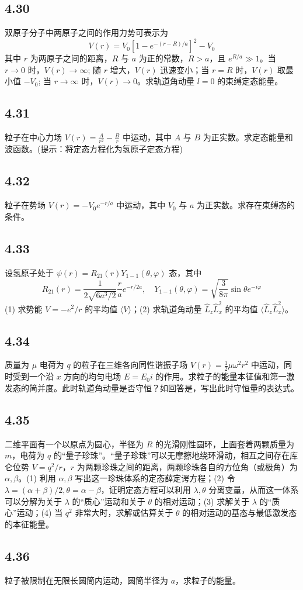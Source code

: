 \subsection{4.30}
双原子分子中两原子之间的作用力势可表示为
$$ V(r) = V_0 \left[ 1 - e^{-(r-R)/a} \right]^2 - V_0 $$
其中 $ r $ 为两原子之间的距离，$ R $ 与 $ a $ 为正的常数，$ R > a $，且 $ e^{R/a} \gg 1 $。当 $ r \to 0 $ 时，$ V(r) \to \infty $; 随 $ r $ 增大，$ V(r) $ 迅速变小；当 $ r = R $ 时，$ V(r) $ 取最小值 $-V_0$; 当 $ r \to \infty $ 时，$ V(r) \to 0 $。求轨道角动量 $ l = 0 $ 的束缚定态能量。

\subsection{4.31}
粒子在中心力场 $V(r) = \frac{A}{r^2} - \frac{B}{r}$ 中运动，其中 $A$ 与 $B$ 为正实数。求定态能量和波函数。(提示：将定态方程化为氢原子定态方程)

\subsection{4.32}
粒子在势场 $ V(r) = -V_0 e^{-r/a} $ 中运动，其中 $V_0$ 与 $a$ 为正实数。求存在束缚态的条件。

\subsection{4.33}
设氢原子处于 $\psi(r) = R_{21}(r)Y_{1-1}(\theta,\varphi)$ 态，其中
$$ R_{21}(r) = \frac{1}{2\sqrt{6a^3/2}} \frac{r}{a} e^{-r/2a}, \quad Y_{1-1}(\theta,\varphi) = \sqrt{\frac{3}{8\pi}} \sin\theta e^{-i\varphi} $$
(1) 求势能 $ V = -e^2 / r $ 的平均值 $\langle V \rangle$；(2) 求轨道角动量 $\hat{L}_z \hat{L}_x^2$ 的平均值 $\langle \hat{L}_z \hat{L}_x^2 \rangle$。

\subsection{4.34}
质量为 $\mu$ 电荷为 $q$ 的粒子在三维各向同性谐振子场 $V(r) = \frac{1}{2}\mu \omega^2 r^2$ 中运动，同时受到一个沿 $x$ 方向的均匀电场 $E = E_0 i$ 的作用。求粒子的能量本征值和第一激发态的简并度。此时轨道角动量是否守恒？如回答是，写出此时守恒量的表达式。

\subsection{4.35}
二维平面有一个以原点为圆心，半径为 $R$ 的光滑刚性圆环，上面套着两颗质量为 $m$，电荷为 $q$ 的“量子珍珠”。“量子珍珠”可以无摩擦地绕环滑动，相互之间存在库仑位势 $V = q^2 / r$，$r$ 为两颗珍珠之间的距离，两颗珍珠各自的方位角（或极角）为 $\alpha, \beta$。(1) 利用 $\alpha, \beta$ 写出这一珍珠体系的定态薛定谔方程；(2) 令 $\lambda = (\alpha + \beta)/2, \theta = \alpha - \beta$，证明定态方程可以利用 $\lambda, \theta$ 分离变量，从而这一体系可以分解为关于 $\lambda$ 的“质心”运动和关于 $\theta$ 的相对运动；(3) 求解关于 $\lambda$ 的“质心”运动；(4) 当 $q^2$ 非常大时，求解或估算关于 $\theta$ 的相对运动的基态与最低激发态的本征能量。

\subsection{4.36}
粒子被限制在无限长圆筒内运动，圆筒半径为 $ a $，求粒子的能量。
